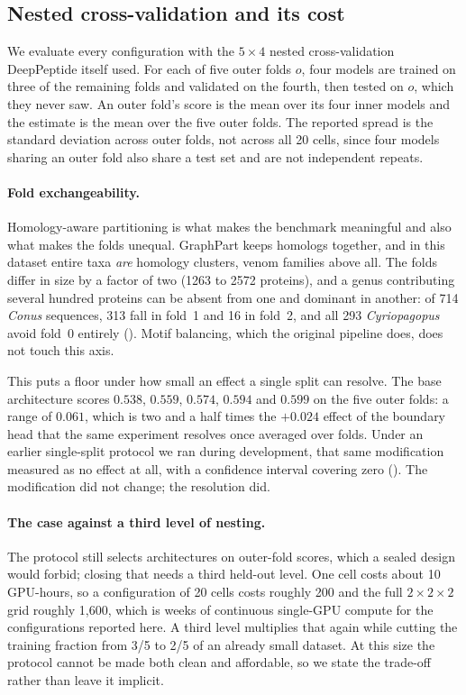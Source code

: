 \documentclass{article}
\begin{document}
\subsection{Nested cross-validation and its cost}
\label{sec:eval-protocol}

We evaluate every configuration with the $5\times4$ nested cross-validation DeepPeptide itself used. For each of five outer folds $o$, four models are trained on three of the remaining folds and validated on the fourth, then tested on $o$, which they never saw. An outer fold's score is the mean over its four inner models and the estimate is the mean over the five outer folds. The reported spread is the standard deviation across outer folds, not across all 20 cells, since four models sharing an outer fold also share a test set and are not independent repeats.

\paragraph{Fold exchangeability.} Homology-aware partitioning is what makes the benchmark meaningful and also what makes the folds unequal. GraphPart keeps homologs together, and in this dataset entire taxa \emph{are} homology clusters, venom families above all. The folds differ in size by a factor of two (1263 to 2572 proteins), and a genus contributing several hundred proteins can be absent from one and dominant in another: of 714 \emph{Conus} sequences, 313 fall in fold~1 and 16 in fold~2, and all 293 \emph{Cyriopagopus} avoid fold~0 entirely (). Motif balancing, which the original pipeline does, does not touch this axis.


This puts a floor under how small an effect a single split can resolve. The base architecture scores $0.538$, $0.559$, $0.574$, $0.594$ and $0.599$ on the five outer folds: a range of $0.061$, which is two and a half times the $+0.024$ effect of the boundary head that the same experiment resolves once averaged over folds. Under an earlier single-split protocol we ran during development, that same modification measured as no effect at all, with a confidence interval covering zero (). The modification did not change; the resolution did.

\paragraph{The case against a third level of nesting.} The protocol still selects architectures on outer-fold scores, which a sealed design would forbid; closing that needs a third held-out level. One cell costs about 10 GPU-hours, so a configuration of 20 cells costs roughly 200 and the full $2\times2\times2$ grid roughly 1{,}600, which is weeks of continuous single-GPU compute for the configurations reported here. A third level multiplies that again while cutting the training fraction from 3/5 to 2/5 of an already small dataset. At this size the protocol cannot be made both clean and affordable, so we state the trade-off rather than leave it implicit.
\end{document}
